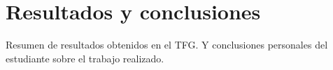 \chapter{Resultados y conclusiones}

Resumen de resultados obtenidos en el TFG. Y conclusiones personales del estudiante sobre el trabajo realizado.

